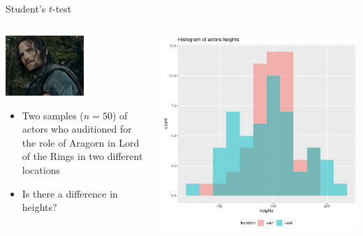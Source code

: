 \documentclass[aspectratio=169]{beamer}\usepackage[]{graphicx}\usepackage[]{color}
\makeatletter
\def\maxwidth{ %
  \ifdim\Gin@nat@width>\linewidth
    \linewidth
  \else
    \Gin@nat@width
  \fi
}
\newenvironment{knitrout}{}{} %
\makeatother
\begin{document}
\begin{frame}[fragile]{Student's $t$-test}

\begin{columns}
  \begin{column}{0.5\textwidth}
  \begin{center}
    	\includegraphics[width=0.55\textwidth]{./images/Aragorn.png}
  \end{center}
  \begin{itemize}
    \item Two samples ($n=50$) of actors who auditioned for the role of Aragorn in Lord of the Rings in two different locations
    \item Is there a difference in heights?
  \end{itemize}
  \end{column}
  \begin{column}{0.5\textwidth}
\begin{knitrout}\scriptsize
{}\color{fgcolor}
\includegraphics[width=\maxwidth]{figure/unnamed-chunk-20-1} 

\end{knitrout}
  \end{column}
\end{columns}
\end{frame}
\end{document}
